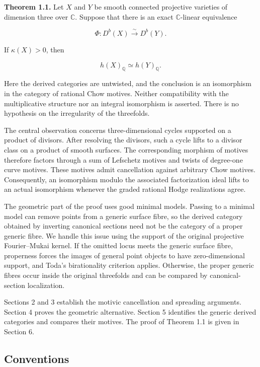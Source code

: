 \documentclass[11pt,a4paper]{article}
\begin{document}
\noindent \textbf{Theorem 1.1.} Let $X$ and $Y$ be smooth connected projective varieties of dimension three over $\mathbb C$. Suppose that there is an exact $\mathbb C$-linear equivalence

\begin{equation*}
\Phi:D^b(X)\xrightarrow{\sim}D^b(Y).
\end{equation*}

If $\kappa(X)>0$, then

\begin{equation*}
h(X)_{\mathbb Q}\simeq h(Y)_{\mathbb Q}.
\end{equation*}

Here the derived categories are untwisted, and the conclusion is an isomorphism in the category of rational Chow motives. Neither compatibility with the multiplicative structure nor an integral isomorphism is asserted. There is no hypothesis on the irregularity of the threefolds.

The central observation concerns three-dimensional cycles supported on a product of divisors. After resolving the divisors, such a cycle lifts to a divisor class on a product of smooth surfaces. The corresponding morphism of motives therefore factors through a sum of Lefschetz motives and twists of degree-one curve motives. These motives admit cancellation against arbitrary Chow motives. Consequently, an isomorphism modulo the associated factorization ideal lifts to an actual isomorphism whenever the graded rational Hodge realizations agree.

The geometric part of the proof uses good minimal models. Passing to a minimal model can remove points from a generic surface fibre, so the derived category obtained by inverting canonical sections need not be the category of a proper generic fibre. We handle this issue using the support of the original projective Fourier--Mukai kernel. If the omitted locus meets the generic surface fibre, properness forces the images of general point objects to have zero-dimensional support, and Toda's birationality criterion applies. Otherwise, the proper generic fibres occur inside the original threefolds and can be compared by canonical-section localization.

Sections 2 and 3 establish the motivic cancellation and spreading arguments. Section 4 proves the geometric alternative. Section 5 identifies the generic derived categories and compares their motives. The proof of Theorem 1.1 is given in Section 6.

\subsection*{Conventions}
\end{document}
